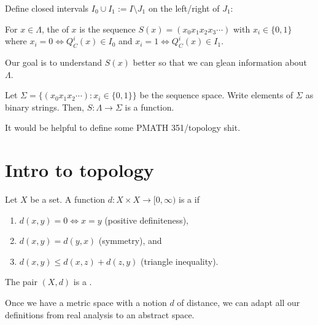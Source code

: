 \documentclass[class=pmath370,tikz,notes]{agony}
\begin{document}
\begin{notation}
  Define closed intervals $I_0 \cup I_1 := I \setminus J_1$ on the left/right of $J_1$:
  \begin{center}
  \end{center}
\end{notation}

\begin{defn}
  For $x \in \Lambda$, the  of $x$ is
  the sequence $S(x) = (x_0x_1x_2x_3\cdots)$ with $x_i \in \{0,1\}$
  where $x_i = 0 \iff Q_C^i(x) \in I_0$
  and $x_i = 1 \iff Q_C^i(x) \in I_1$.
\end{defn}

Our goal is to understand $S(x)$ better so that we can glean information about $\Lambda$.

\begin{notation}
  Let $\Sigma = \{(x_0x_1x_2\cdots) : x_i \in \{0,1\}\}$ be the sequence space.
  Write elements of $\Sigma$ as binary strings.
  Then, $S : \Lambda \to \Sigma$ is a function.
\end{notation}

It would be helpful to define some PMATH 351/topology shit.

\section{Intro to topology}

\begin{defn}
  Let $X$ be a set.
  A function $d : X \times X \to [0,\infty)$ is a  if
  \begin{enumerate}[nosep]
    \item $d(x,y) = 0 \iff x = y$ (positive definiteness),
    \item $d(x,y) = d(y,x)$ (symmetry), and
    \item $d(x,y) \leq d(x,z) + d(z,y)$ (triangle inequality).
  \end{enumerate}
  The pair $(X,d)$ is a .
\end{defn}

Once we have a metric space with a notion $d$ of distance,
we can adapt all our definitions from real analysis to an abstract space.
\end{document}
